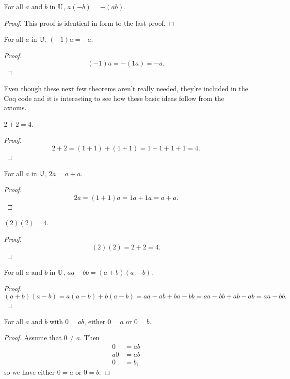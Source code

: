 \documentclass[../math.tex]{subfiles}
\begin{document}
\begin{theorem}
    For all $a$ and $b$ in $\mathbb{U}$, $a(-b) = -(ab)$.
\end{theorem}
\begin{proof}
    This proof is identical in form to the last proof.
\end{proof}

\begin{theorem}
    For all $a$ in $\mathbb{U}$, $(-1)a = -a$.
\end{theorem}
\begin{proof}
    \[
        (-1)a = -(1a) = -a.
    \]
\end{proof}

Even though these next few theorems aren't really needed, they're included in
the Coq code and it is interesting to see how these basic ideas follow from the
axioms.

\begin{theorem}
    $2 + 2 = 4$.
\end{theorem}
\begin{proof}
    \[
        2 + 2 = (1 + 1) + (1 + 1) = 1 + 1 + 1 + 1 = 4.
    \]
\end{proof}

\begin{theorem}
    For all $a$ in $\mathbb{U}$, $2a = a + a$.
\end{theorem}
\begin{proof}
    \[
        2a = (1 + 1)a = 1a + 1a = a + a.
    \]
\end{proof}

\begin{theorem}
    $(2)(2) = 4$.
\end{theorem}
\begin{proof}
    \[
        (2)(2) = 2 + 2 = 4.
    \]
\end{proof}

\begin{theorem}
    For all $a$ and $b$ in $\mathbb{U}$, $aa - bb = (a + b) (a - b)$.
\end{theorem}
\begin{proof}
    \[
        (a + b)(a - b) = a(a - b) + b(a - b) = aa - ab + ba - bb = aa - bb + ab
        - ab = aa - bb.
    \]
\end{proof}

\begin{theorem}
    For all $a$ and $b$ with $0 = ab$, either $0 = a$ or $0 = b$.
\end{theorem}
\begin{proof}
    Assume that $0 \neq a$.  Then
    \begin{align*}
        0 &= ab \\
        a0 &= ab \\
        0 &= b,
    \end{align*}
    so we have either $0 = a$ or $0 = b$.
\end{proof}
\end{document}
